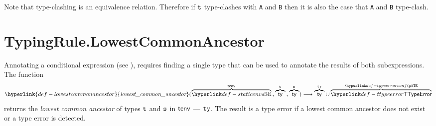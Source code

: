 \documentclass{book}
\newcommand\lca[0]{\hyperlink{def-lowestcommonancestor}{\textfunc{lowest\_common\_ancestor}}}
\begin{document}
Note that type-clashing is an equivalence relation. Therefore if $\texttt{t}$
type-clashes with \texttt{A} and \texttt{B} then it is also the case that \texttt{A} and \texttt{B} type-clash.


\section{TypingRule.LowestCommonAncestor \label{sec:TypingRule.LowestCommonAncestor}}
\hypertarget{def-lowestcommonancestor}{}
Annotating a conditional expression (see ),
requires finding a single type that can be used to annotate the results of both subexpressions.
The function
\[
  \lca(\overname{\staticenvs}{\tenv} \aslsep \overname{\ty}{\vt} \aslsep \overname{\ty}{\vs})
  \aslto \overname{\ty}{\tty} \cup \overname{\TTypeError}{\TypeErrorConfig}
\]
returns the \emph{lowest common ancestor} of types $\texttt{t}$ and $\texttt{s}$ in $\textsf{tenv}$ --- $\texttt{ty}$.
The result is a type error if a lowest common ancestor does not exist or a type error is detected.
\end{document}
